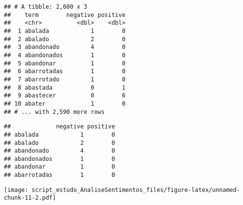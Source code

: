 \documentclass[
]{article}
\newenvironment{Shaded}{\begin{snugshade}}{\end{snugshade}}
\newcommand{\DataTypeTok}[1]{\textcolor[rgb]{0.13,0.29,0.53}{#1}}
\newcommand{\DecValTok}[1]{\textcolor[rgb]{0.00,0.00,0.81}{#1}}
\newcommand{\KeywordTok}[1]{\textcolor[rgb]{0.13,0.29,0.53}{\textbf{#1}}}
\newcommand{\NormalTok}[1]{#1}
\newcommand{\OperatorTok}[1]{\textcolor[rgb]{0.81,0.36,0.00}{\textbf{#1}}}
\newcommand{\StringTok}[1]{\textcolor[rgb]{0.31,0.60,0.02}{#1}}
\begin{document}
\begin{verbatim}
## # A tibble: 2,600 x 3
##    term        negative positive
##    <chr>          <dbl>    <dbl>
##  1 abalada            1        0
##  2 abalado            2        0
##  3 abandonado         4        0
##  4 abandonados        1        0
##  5 abandonar          1        0
##  6 abarrotadas        1        0
##  7 abarrotado         1        0
##  8 abastada           0        1
##  9 abastecer          0        6
## 10 abater             1        0
## # ... with 2,590 more rows
\end{verbatim}

\begin{Shaded}
\end{Shaded}

\begin{verbatim}
##             negative positive
## abalada            1        0
## abalado            2        0
## abandonado         4        0
## abandonados        1        0
## abandonar          1        0
## abarrotadas        1        0
\end{verbatim}

\begin{Shaded}
\end{Shaded}

\texttt{[image: script\_estudo\_AnaliseSentimentos\_files/figure-latex/unnamed-chunk-11-2.pdf]}
\end{document}
